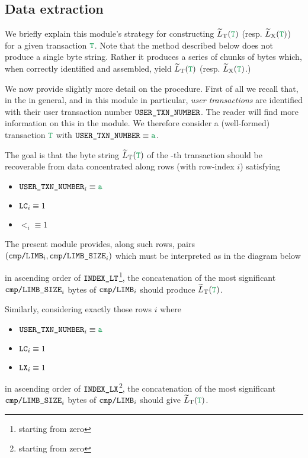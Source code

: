 \subsection{Data extraction}

We briefly explain this module's strategy for constructing $\locLtTildeOfT$ (resp. $\locLxTildeOfT$) for a given transaction $\locTransaction$.
Note that the method described below does not produce a single byte string.
Rather it produces a series of chunks of bytes which, when correctly identified and assembled, yield $\locLtTildeOfT$ (resp. $\locLxTildeOfT$.)

We now provide slightly more detail on the procedure.
First of all we recall that, in the \zkEvm{} in general, and in this module in particular,
\emph{user transactions} are identified with their user transaction number
$\texttt{USER}\texttt{\_}\texttt{TXN\_NUMBER}$.
The reader will find more information on this in the \userTxnDataMod{} module.
We therefore consider a (well-formed) transaction $\locTransaction$ with $\userTransactionNumber \equiv \loc{a}$.

The goal is that the byte string $\locLtTildeOfT$
of the -th transaction
should be recoverable from data concentrated along rows
(with row-index $i$) satisfying
\begin{multicols}{3}
	\begin{itemize}
		\item $\userTransactionNumber _{i} \equiv \loc{a}$
		\item $\texttt{LC}                    _{i} \equiv 1$
		\item $\lt                    _{i} \equiv 1$
	\end{itemize}
\end{multicols}
The present module provides, along such rows,
pairs
$(\texttt{cmp}\texttt{/}\texttt{{\texttt{LIMB}}} _{i},
\texttt{cmp}\texttt{/}\texttt{{LIMB\_SIZE}} _{i})$
which must be interpreted as in the diagram below



in ascending order of $\texttt{INDEX\_LT}$\footnote{starting from zero},
the concatenation of the most significant 
$\texttt{cmp}\texttt{/}\texttt{{LIMB\_SIZE}} _{i}$ bytes of $\texttt{cmp}\texttt{/}\texttt{{\texttt{LIMB}}} _{i}$ should produce $\locLtTildeOfT$.

Similarly, considering exactly those rows $i$ where
\begin{multicols}{3}
	\begin{itemize}
		\item $\userTransactionNumber _{i} \equiv \loc{a}$
		\item $\texttt{LC}                    _{i} \equiv 1$
		\item $\texttt{LX}                    _{i} \equiv 1$
	\end{itemize}
\end{multicols}
\noindent in ascending order of $\texttt{INDEX\_LX}$\footnote{starting from zero},
the concatenation of the most significant 
$\texttt{cmp}\texttt{/}\texttt{{LIMB\_SIZE}} _{i}$ bytes of $\texttt{cmp}\texttt{/}\texttt{{\texttt{LIMB}}} _{i}$ should give $\locLtTildeOfT$.

